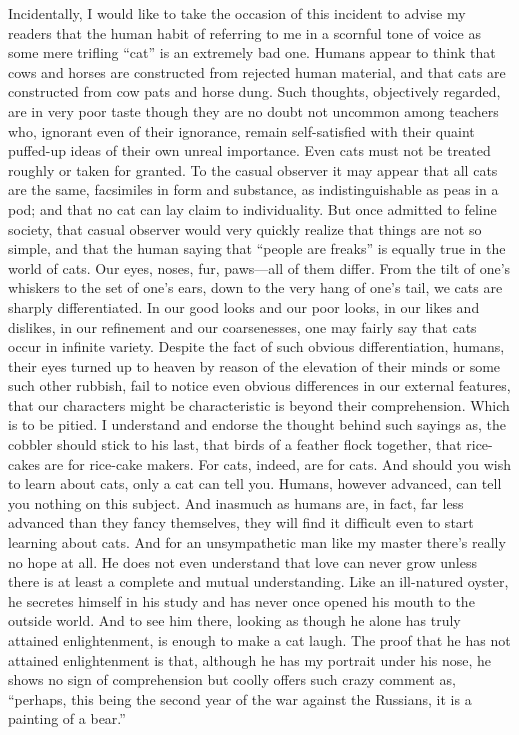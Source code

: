 \documentclass[12pt, openright]{book}
\begin{document}
Incidentally, I would like to take the occasion of this incident to
advise my readers that the human habit of referring to me in a scornful
tone of voice as some mere trifling ``cat'' is an extremely bad one.
Humans appear to think that cows and horses are constructed from
rejected human material, and that cats are constructed from cow pats and
horse dung. Such thoughts, objectively regarded, are in very poor taste
though they are no doubt not uncommon among teachers who, ignorant even
of their ignorance, remain self-satisfied with their quaint puffed-up
ideas of their own unreal importance. Even cats must not be treated
roughly or taken for granted. To the casual observer it may appear that
all cats are the same, facsimiles in form and substance, as
indistinguishable as peas in a pod; and that no cat can lay claim to
individuality. But once admitted to feline society, that casual observer
would very quickly realize that things are not so simple, and that the
human saying that ``people are freaks'' is equally true in the world of
cats. Our eyes, noses, fur, paws---all of them differ. From the tilt of
one's whiskers to the set of one's ears, down to the very hang of one's
tail, we cats are sharply differentiated. In our good looks and our poor
looks, in our likes and dislikes, in our refinement and our
coarsenesses, one may fairly say that cats occur in infinite variety.
Despite the fact of such obvious differentiation, humans, their eyes
turned up to heaven by reason of the elevation of their minds or some
such other rubbish, fail to notice even obvious differences in our
external features, that our characters might be characteristic is beyond
their comprehension. Which is to be pitied. I understand and endorse the
thought behind such sayings as, the cobbler should stick to his last,
that birds of a feather flock together, that rice-cakes are for
rice-cake makers. For cats, indeed, are for cats. And should you wish to
learn about cats, only a cat can tell you. Humans, however advanced, can
tell you nothing on this subject. And inasmuch as humans are, in fact,
far less advanced than they fancy themselves, they will find it
difficult even to start learning about cats. And for an unsympathetic
man like my master there's really no hope at all. He does not even
understand that love can never grow unless there is at least a complete
and mutual understanding. Like an ill-natured oyster, he secretes
himself in his study and has never once opened his mouth to the outside
world. And to see him there, looking as though he alone has truly
attained enlightenment, is enough to make a cat laugh. The proof that he
has not attained enlightenment is that, although he has my portrait
under his nose, he shows no sign of comprehension but coolly offers such
crazy comment as, ``perhaps, this being the second year of the war
against the Russians, it is a painting of a bear.''
\end{document}

